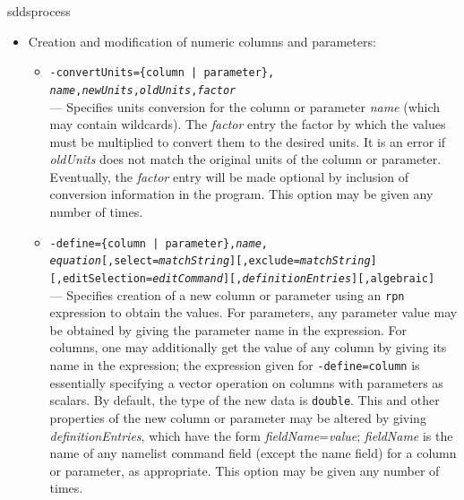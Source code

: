 \begin{sddsprog}{sddsprocess}
\begin{itemize}
\begin{itemize}
         \item {\tt -system=\{column | parameter\},{\em newName},{\em commandName},}\\ {\tt [{\em
definitionEntries}]} --- Specifies creation of a new string column (parameter) by executing an existing string
column (parameter) using a subprocess.  The first line of output from the subprocess is acquired and placed in the
new column (parameter).

        If {\em commandName} contains wildcards, then {\em newName} must contain at least one occurrence of
``\%s''.   In this case, for each name that matches {\em commandName}, an additional element is created, with a
name created by substituting the name for ``\%s'' in {\em newName}.

 
         \end{itemize}
 
    \item Creation and modification of numeric columns and parameters: \\

        \begin{itemize}

        \item {\tt -convertUnits=\{column | parameter\},{\em
name},{\em newUnits},}{\tt {\em oldUnits},{\em factor}}\\ ---
Specifies units conversion for the column or parameter {\em name}
(which may contain wildcards).  The {\em factor} entry the factor by
which the values must be multiplied to convert them to the desired
units.  It is an error if {\em oldUnits} does not match the original
units of the column or parameter.  Eventually, the {\em factor} entry
will be made optional by inclusion of conversion information in the
program.  This option may be given any number of times.

        \item {\tt -define=\{column | parameter\},{\em name},{\em
equation}[,select={\em matchString}][,exclude={\em matchString}]} 
{\tt [,editSelection={\em editCommand}][,{\em definitionEntries}][,algebraic] }\\ --- Specifies
creation of a new column or parameter using an {\tt rpn} expression to
obtain the values.  For parameters, any parameter value may be
obtained by giving the parameter name in the expression.  For columns,
one may additionally get the value of any column by giving its name in
the expression; the expression given for {\tt -define=column} is
essentially specifying a vector operation on columns with parameters
as scalars.  By default, the type of the new data is \verb|double|.
This and other properties of the new column or parameter may be
altered by giving {\em definitionEntries}, which have the form {\em
fieldName}={\em value}; {\em fieldName} is the name of any namelist
command field (except the name field) for a column or parameter, as
appropriate.  This option may be given any number of times.


\end{itemize}
\end{itemize}
\end{sddsprog}
